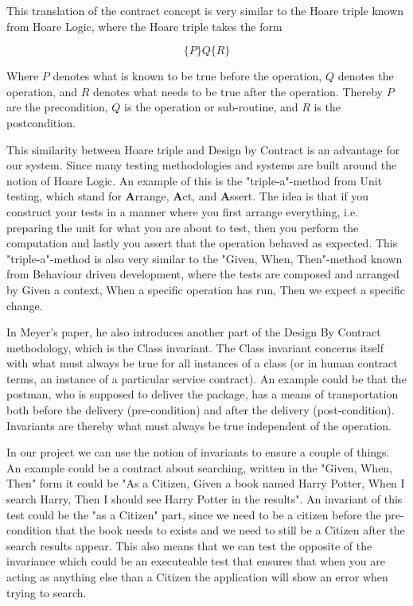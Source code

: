 This translation of the contract concept is very similar to the Hoare triple known from Hoare Logic, where the Hoare triple takes the form

\begin{equation}
\{P\} Q \{R\}
\end{equation}

Where $P$ denotes what is known to be true before the operation, $Q$ denotes the operation, and $R$ denotes what needs to be true after the operation. Thereby $P$ are the precondition, $Q$ is the operation or sub-routine, and $R$ is the postcondition. 

This similarity between Hoare triple and Design by Contract is an advantage for our system. Since many testing methodologies and systems are built around the notion of Hoare Logic. 
An example of this is the "triple-a"-method from Unit testing, which stand for \textbf{A}rrange, \textbf{A}ct, and \textbf{A}ssert.
The idea is that if you construct your tests in a manner where you first arrange everything, i.e. preparing the unit for what you are about to test, then you perform the computation and lastly you assert that the operation behaved as expected. 
This "triple-a"-method is also very similar to the "Given, When, Then"-method known from Behaviour driven development, where the tests are composed and arranged by Given a context, When a specific operation has run, Then we expect a specific change. 

In Meyer's paper, he also introduces another part of the Design By Contract methodology, which is the Class invariant. The Class invariant concerns itself with what must always be true for all instances of a class (or in human contract terms, an instance of a particular service contract). An example could be that the postman, who is supposed to deliver the package, has a means of transportation both before the delivery (pre-condition) and after the delivery (post-condition). Invariants are thereby what must always be true independent of the operation.

In our project we can use the notion of invariants to ensure a couple of things. 
An example could be a contract about searching, written in the "Given, When, Then" form it could be "As a Citizen, Given a book named Harry Potter, When I search Harry, Then I should see Harry Potter in the results".
An invariant of this test could be the "as a Citizen" part, since we need to be a citizen before the pre-condition that the book needs to exists and we need to still be a Citizen after the search results appear.
This also means that we can test the opposite of the invariance which could be an executeable test that ensures that when you are acting as anything else than a Citizen the application will show an error when trying to search.

